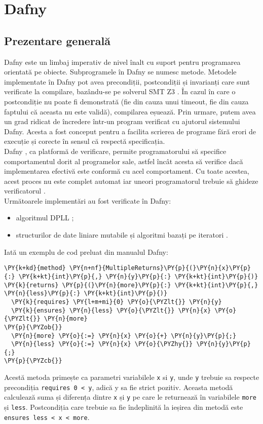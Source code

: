 \chapter{Dafny}
\section{Prezentare generală}

Dafny este un limbaj imperativ de nivel înalt cu suport pentru programarea orientată pe obiecte. Subprogramele în Dafny se numesc metode.  Metodele implementate în Dafny
pot avea precondiții, postcondiții și invarianți care sunt verificate la compilare, bazându-se pe solverul SMT Z3 \citep{DBLP:conf/tacas/MouraB08}. În cazul în care o postcondiție nu poate fi demonstrată (fie din cauza unui timeout, fie din cauza faptului că aceasta nu este validă), compilarea eșuează. Prin urmare, putem avea un grad ridicat de încredere într-un program verificat cu ajutorul sistemului Dafny.
Acesta a fost conceput pentru a facilita scrierea de programe fără erori de execuție și corecte în sensul că respectă specificația.\\
Dafny \citep{dafny-reference-manual}, ca platformă de verificare,  permite programatorului să specifice comportamentul dorit al programelor sale, astfel încât acesta să verifice dacă implementarea efectivă este conformă cu acel comportament. Cu toate acestea, acest proces nu este complet automat iar uneori programatorul trebuie să ghideze verificatorul \citep{dafny-reference-manual}.\\
Următoarele implementări au fost verificate în Dafny:
\begin{itemize}
    \item algoritmul DPLL \citep{DBLP:journals/corr/abs-1909-01743};
    \item structurilor de date liniare mutabile și algoritmi bazați pe iteratori \citep{DBLP:journals/jlap/BlazquezMS23}.
\end{itemize}
Iată un exemplu de cod preluat din manualul Dafny:
\begin{small}
\begin{Verbatim}[commandchars=\\\{\}, fontsize=\footnotesize]
\PY{k+kd}{method} \PY{n+nf}{MultipleReturns}\PY{p}{(}\PY{n}{x}\PY{p}{:} \PY{k+kt}{int}\PY{p}{,} \PY{n}{y}\PY{p}{:} \PY{k+kt}{int}\PY{p}{)} \PY{k}{returns} \PY{p}{(}\PY{n}{more}\PY{p}{:} \PY{k+kt}{int}\PY{p}{,} \PY{n}{less}\PY{p}{:} \PY{k+kt}{int}\PY{p}{)}
  \PY{k}{requires} \PY{l+m+mi}{0} \PY{o}{\PYZlt{}} \PY{n}{y}
  \PY{k}{ensures} \PY{n}{less} \PY{o}{\PYZlt{}} \PY{n}{x} \PY{o}{\PYZlt{}} \PY{n}{more}
\PY{p}{\PYZob{}}
  \PY{n}{more} \PY{o}{:=} \PY{n}{x} \PY{o}{+} \PY{n}{y}\PY{p}{;}
  \PY{n}{less} \PY{o}{:=} \PY{n}{x} \PY{o}{\PYZhy{}} \PY{n}{y}\PY{p}{;}
\PY{p}{\PYZcb{}}
\end{Verbatim}
\end{small}
Acestă metoda primește ca parametri variabilele \texttt{x} si \texttt{y}, unde \texttt{y} trebuie sa respecte precondiția \texttt{requires 0 < y}, adică y sa fie strict pozitiv. Aceasta metodă calculează suma și diferența dintre \texttt{x} și \texttt{y} pe care le returnează în variabilele \texttt{more} și \texttt{less}. Postcondiția care trebuie sa fie îndeplinită la ieșirea din metodă este \texttt{ensures less < x < more}. 
